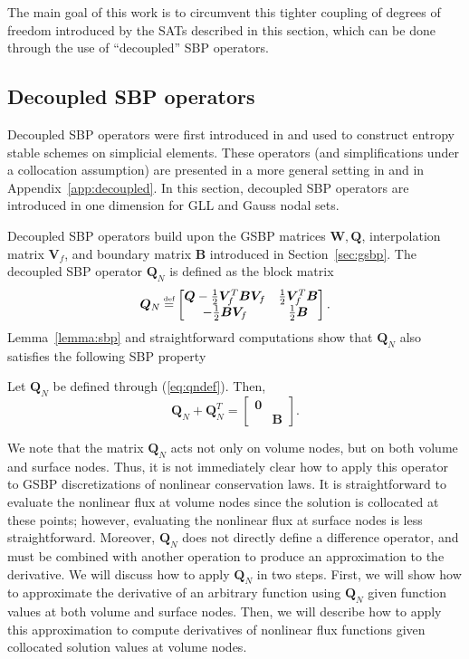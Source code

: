 \documentclass[review,onefignum,onetabnum,final]{siamart171218}
\newcommand\myeq{\mathrel{\stackrel{\makebox[0pt]{\mbox{\normalfont\tiny def}}}{=}}}
\begin{document}
The main goal of this work is to circumvent this tighter coupling of degrees of freedom introduced by the SATs described in this section, which can be done through the use of ``decoupled'' SBP operators.  

\subsection{Decoupled SBP operators}

Decoupled SBP operators were first introduced in \cite{chan2017discretely} and used to construct entropy stable schemes on simplicial elements.  These operators (and simplifications under a collocation assumption) are presented in a more general setting in \cite{chan2017discretely, chan2018discretely} and in Appendix~\ref{app:decoupled}.  In this section, decoupled SBP operators are introduced in one dimension for GLL and Gauss nodal sets.  

Decoupled SBP operators build upon the GSBP matrices $\bm{W}, \bm{Q}$, interpolation matrix $\bm{V}_f$, and boundary matrix $\bm{B}$ introduced in Section~\ref{sec:gsbp}.  The decoupled SBP operator $\bm{Q}_N$ is defined as the block matrix 
\begin{equation}
\bm{Q}_N \myeq \begin{bmatrix}
\bm{Q} - \frac{1}{2}\bm{V}_f^T\bm{B}\bm{V}_f & \frac{1}{2}\bm{V}_f^T\bm{B}\\
-\frac{1}{2}\bm{B}\bm{V}_f & \frac{1}{2}\bm{B}
\end{bmatrix}.
\label{eq:qndef}
\end{equation}
Lemma~\ref{lemma:sbp} and straightforward computations show that $\bm{Q}_N$ also satisfies the following SBP property
\begin{lemma}
\label{lemma:dsbp}
Let $\bm{Q}_N$ be defined through (\ref{eq:qndef}).  Then,
\[
\bm{Q}_N + \bm{Q}_N^T = \begin{bmatrix}
\bm{0} &\\
& \bm{B}
\end{bmatrix}.
\]
\end{lemma}

We note that the matrix $\bm{Q}_N$ acts not only on volume nodes, but on both volume and surface nodes.  Thus, it is not immediately clear how to apply this operator to GSBP discretizations of nonlinear conservation laws.  It is straightforward to evaluate the nonlinear flux at volume nodes since the solution is collocated at these points; however, evaluating the nonlinear flux at surface nodes is less straightforward.  Moreover, $\bm{Q}_N$ does not directly define a difference operator, and must be combined with another operation to produce an approximation to the derivative.  We will discuss how to apply $\bm{Q}_N$ in two steps.  First, we will show how to approximate the derivative of an arbitrary function using $\bm{Q}_N$ given function values at both volume and surface nodes.  Then, we will describe how to apply this approximation to compute derivatives of nonlinear flux functions given collocated solution values at volume nodes.    
\end{document}
